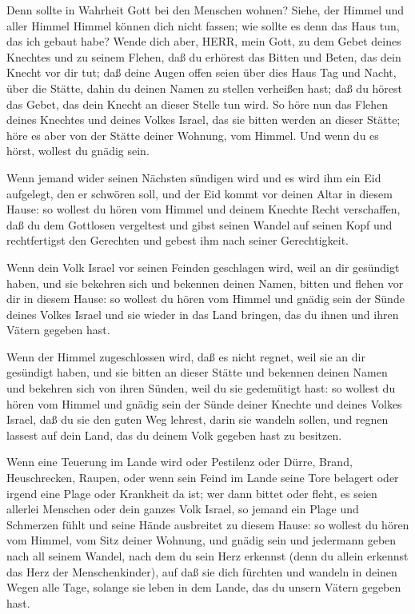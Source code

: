  Denn sollte in Wahrheit Gott bei den Menschen wohnen?
Siehe, der Himmel und aller Himmel Himmel können dich nicht fassen; wie
sollte es denn das Haus tun, das ich gebaut habe?  Wende
dich aber, HERR, mein Gott, zu dem Gebet deines Knechtes und zu seinem
Flehen, daß du erhörest das Bitten und Beten, das dein Knecht vor dir
tut;  daß deine Augen offen seien über dies Haus Tag und
Nacht, über die Stätte, dahin du deinen Namen zu stellen verheißen hast;
daß du hörest das Gebet, das dein Knecht an dieser Stelle tun wird.
 So höre nun das Flehen deines Knechtes und deines Volkes
Israel, das sie bitten werden an dieser Stätte; höre es aber von der
Stätte deiner Wohnung, vom Himmel. Und wenn du es hörst, wollest du
gnädig sein.

 Wenn jemand wider seinen Nächsten sündigen wird und es
wird ihm ein Eid aufgelegt, den er schwören soll, und der Eid kommt vor
deinen Altar in diesem Hause:  so wollest du hören vom
Himmel und deinem Knechte Recht verschaffen, daß du dem Gottlosen
vergeltest und gibst seinen Wandel auf seinen Kopf und rechtfertigst den
Gerechten und gebest ihm nach seiner Gerechtigkeit.

 Wenn dein Volk Israel vor seinen Feinden geschlagen wird,
weil an dir gesündigt haben, und sie bekehren sich und bekennen deinen
Namen, bitten und flehen vor dir in diesem Hause:  so
wollest du hören vom Himmel und gnädig sein der Sünde deines Volkes
Israel und sie wieder in das Land bringen, das du ihnen und ihren Vätern
gegeben hast.

 Wenn der Himmel zugeschlossen wird, daß es nicht regnet,
weil sie an dir gesündigt haben, und sie bitten an dieser Stätte und
bekennen deinen Namen und bekehren sich von ihren Sünden, weil du sie
gedemütigt hast:  so wollest du hören vom Himmel und gnädig
sein der Sünde deiner Knechte und deines Volkes Israel, daß du sie den
guten Weg lehrest, darin sie wandeln sollen, und regnen lassest auf dein
Land, das du deinem Volk gegeben hast zu besitzen.

 Wenn eine Teuerung im Lande wird oder Pestilenz oder
Dürre, Brand, Heuschrecken, Raupen, oder wenn sein Feind im Lande seine
Tore belagert oder irgend eine Plage oder Krankheit da ist;
 wer dann bittet oder fleht, es seien allerlei Menschen
oder dein ganzes Volk Israel, so jemand ein Plage und Schmerzen fühlt
und seine Hände ausbreitet zu diesem Hause:  so wollest du
hören vom Himmel, vom Sitz deiner Wohnung, und gnädig sein und jedermann
geben nach all seinem Wandel, nach dem du sein Herz erkennst (denn du
allein erkennst das Herz der Menschenkinder),  auf daß sie
dich fürchten und wandeln in deinen Wegen alle Tage, solange sie leben
in dem Lande, das du unsern Vätern gegeben hast.

